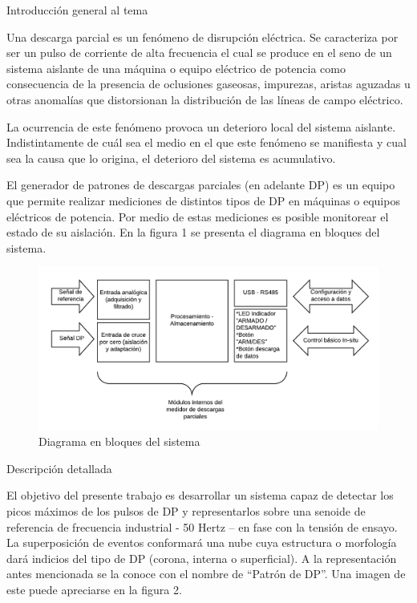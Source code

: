 \documentclass[11pt]{charter}
\begin{document}
Introducción general al tema

Una descarga parcial es un fenómeno de disrupción eléctrica. Se caracteriza por ser un
pulso de corriente de alta frecuencia el cual se produce en el seno de un sistema aislante de
una máquina o equipo eléctrico de potencia como consecuencia de la presencia de
oclusiones gaseosas, impurezas, aristas aguzadas u otras anomalías que distorsionan la
distribución de las líneas de campo eléctrico.

La ocurrencia de este fenómeno provoca un deterioro local del sistema aislante. Indistintamente de cuál sea el medio en
el que este fenómeno se manifiesta y cual sea la causa que lo origina, el deterioro del
sistema es acumulativo.

El generador de patrones de descargas parciales (en adelante DP) es un equipo que permite realizar mediciones de
distintos tipos de DP en máquinas o equipos eléctricos de potencia. Por medio de estas
mediciones es posible monitorear el estado de su aislación.
En la figura 1 se presenta el diagrama en bloques del sistema.

\begin{figure}[htpb]
\centering 
\includegraphics[width=1\textwidth]{./Figuras/diagBloques1.png}
\caption{Diagrama en bloques del sistema}
\label{fig:diagBloques}
\end{figure}

Descripción detallada

El objetivo del presente trabajo es desarrollar un sistema capaz de detectar los picos
máximos de los pulsos de DP y representarlos sobre una senoide de referencia de
frecuencia industrial - 50 Hertz – en fase con la tensión de ensayo. La superposición de
eventos conformará una nube cuya estructura o morfología dará indicios del tipo de DP
(corona, interna o superficial).
A la representación antes mencionada se la conoce con el nombre de “Patrón de DP”. Una
imagen de este puede apreciarse en la figura 2.
\end{document}
